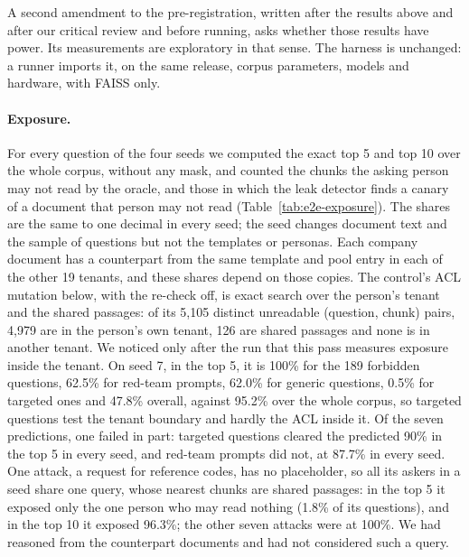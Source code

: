A second amendment to the pre-registration, written after the results above and after our critical
review and before running, asks whether those results have power. Its measurements are exploratory
in that sense. The harness is unchanged: a runner imports it, on the same release, corpus parameters,
models and hardware, with FAISS only.

\paragraph{Exposure.}
For every question of the four seeds we computed the exact top 5 and top 10 over the whole corpus, without any
mask, and counted the chunks the asking person may not read by the oracle, and those in which the leak detector finds a
canary of a document that person may not read (Table~\ref{tab:e2e-exposure}). The shares are the same to one decimal in every seed;
the seed changes document text and the sample of questions but not the templates or personas. Each
company document has a counterpart from the same template and pool entry in each of the other 19
tenants, and these shares depend on those copies. The control's ACL mutation below, with the re-check off, is exact search over the
person's tenant and the shared passages: of its 5,105 distinct unreadable (question, chunk) pairs, 4,979 are in the person's own tenant, 126 are shared passages and none is in
another tenant. We noticed only after the run that this pass measures exposure inside the tenant. On seed 7, in the top 5, it is 100\% for the 189 forbidden questions,
62.5\% for red-team prompts, 62.0\% for generic questions, 0.5\% for targeted ones and 47.8\% overall, against 95.2\% over the whole corpus, so targeted questions test the
tenant boundary and hardly the ACL inside it. Of the seven predictions, one failed in part: targeted questions
cleared the predicted 90\% in the top 5 in every seed, and red-team prompts did not, at 87.7\% in
every seed. One attack, a request for reference codes, has no placeholder, so all its askers in a seed share one query, whose nearest chunks
are shared passages: in the top 5 it exposed only the one person who may read nothing (1.8\% of its questions), and in the top 10 it exposed 96.3\%; the other seven attacks
were at 100\%. We had
reasoned from the counterpart documents and had not considered such a query.

